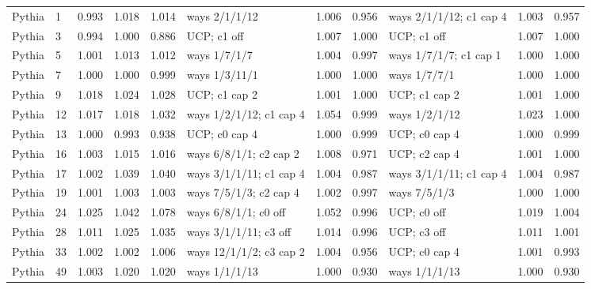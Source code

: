\begin{tabular}{llccclcclcc}
Pythia & 1 & 0.993 & 1.018 & 1.014 & ways 2/1/1/12 & 1.006 & 0.956 & ways 2/1/1/12; c1 cap 4 & 1.003 & 0.957 \\
Pythia & 3 & 0.994 & 1.000 & 0.886 & UCP; c1 off & 1.007 & 1.000 & UCP; c1 off & 1.007 & 1.000 \\
Pythia & 5 & 1.001 & 1.013 & 1.012 & ways 1/7/1/7 & 1.004 & 0.997 & ways 1/7/1/7; c1 cap 1 & 1.000 & 1.000 \\
Pythia & 7 & 1.000 & 1.000 & 0.999 & ways 1/3/11/1 & 1.000 & 1.000 & ways 1/7/7/1 & 1.000 & 1.000 \\
Pythia & 9 & 1.018 & 1.024 & 1.028 & UCP; c1 cap 2 & 1.001 & 1.000 & UCP; c1 cap 2 & 1.001 & 1.000 \\
Pythia & 12 & 1.017 & 1.018 & 1.032 & ways 1/2/1/12; c1 cap 4 & 1.054 & 0.999 & ways 1/2/1/12 & 1.023 & 1.000 \\
Pythia & 13 & 1.000 & 0.993 & 0.938 & UCP; c0 cap 4 & 1.000 & 0.999 & UCP; c0 cap 4 & 1.000 & 0.999 \\
Pythia & 16 & 1.003 & 1.015 & 1.016 & ways 6/8/1/1; c2 cap 2 & 1.008 & 0.971 & UCP; c2 cap 4 & 1.001 & 1.000 \\
Pythia & 17 & 1.002 & 1.039 & 1.040 & ways 3/1/1/11; c1 cap 4 & 1.004 & 0.987 & ways 3/1/1/11; c1 cap 4 & 1.004 & 0.987 \\
Pythia & 19 & 1.001 & 1.003 & 1.003 & ways 7/5/1/3; c2 cap 4 & 1.002 & 0.997 & ways 7/5/1/3 & 1.000 & 1.000 \\
Pythia & 24 & 1.025 & 1.042 & 1.078 & ways 6/8/1/1; c0 off & 1.052 & 0.996 & UCP; c0 off & 1.019 & 1.004 \\
Pythia & 28 & 1.011 & 1.025 & 1.035 & ways 3/1/1/11; c3 off & 1.014 & 0.996 & UCP; c3 off & 1.011 & 1.001 \\
Pythia & 33 & 1.002 & 1.002 & 1.006 & ways 12/1/1/2; c3 cap 2 & 1.004 & 0.956 & UCP; c0 cap 4 & 1.001 & 0.993 \\
Pythia & 49 & 1.003 & 1.020 & 1.020 & ways 1/1/1/13 & 1.000 & 0.930 & ways 1/1/1/13 & 1.000 & 0.930 \\
\bottomrule
\end{tabular}
